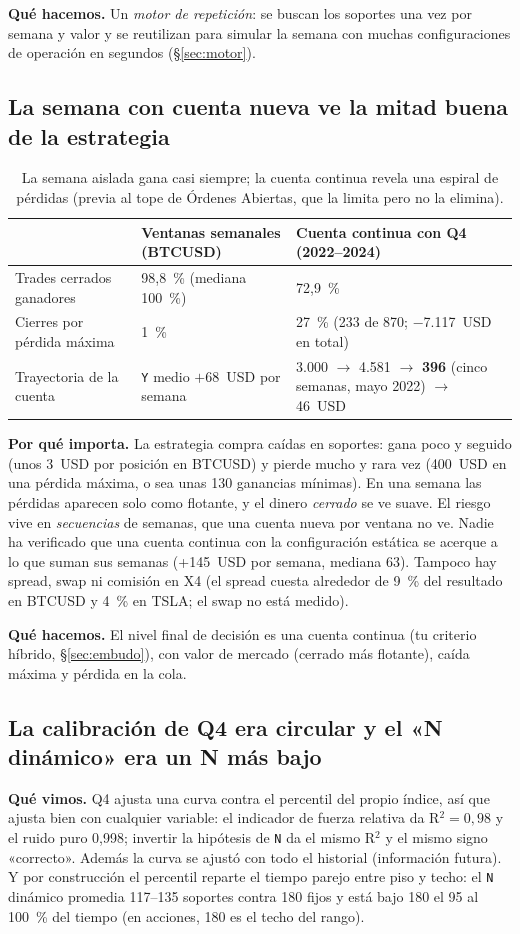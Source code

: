 \documentclass[11pt,a4paper]{article}
\newcommand{\code}[1]{\texttt{\small #1}}
\newcommand{\mn}[1]{$-$#1}
\begin{document}
\textbf{Qué hacemos.} Un \emph{motor de repetición}: se buscan los soportes una vez por semana y valor y se
reutilizan para simular la semana con muchas configuraciones de operación en segundos (§\ref{sec:motor}).

\subsection{La semana con cuenta nueva ve la mitad buena de la estrategia}
\begin{table}[H]
\centering\small
\begin{tabularx}{\linewidth}{lXX}
\toprule
 & Ventanas semanales (BTCUSD) & Cuenta continua con Q4 (2022--2024) \\
\midrule
Trades cerrados ganadores & 98,8~\% (mediana 100~\%) & 72,9~\% \\
Cierres por pérdida máxima & 1~\% & 27~\% (233 de 870; \mn{}7.117~USD en total) \\
Trayectoria de la cuenta & \code{Y} medio $+$68~USD por semana & 3.000 $\rightarrow$ 4.581 $\rightarrow$ \textbf{396} (cinco semanas, mayo 2022) $\rightarrow$ 46~USD \\
\bottomrule
\end{tabularx}
\caption{La semana aislada gana casi siempre; la cuenta continua revela una espiral de pérdidas (previa al tope
de Órdenes Abiertas, que la limita pero no la elimina).}
\end{table}

\textbf{Por qué importa.} La estrategia compra caídas en soportes: gana poco y seguido (unos 3~USD por posición
en BTCUSD) y pierde mucho y rara vez (400~USD en una pérdida máxima, o sea unas 130 ganancias mínimas). En una
semana las pérdidas aparecen solo como flotante, y el dinero \emph{cerrado} se ve suave. El riesgo vive en
\emph{secuencias} de semanas, que una cuenta nueva por ventana no ve. Nadie ha verificado que una cuenta continua
con la configuración estática se acerque a lo que suman sus semanas (+145~USD por semana, mediana 63).
Tampoco hay spread, swap ni comisión en X4 (el spread cuesta alrededor de 9~\% del resultado en BTCUSD y 4~\%
en TSLA; el swap no está medido).

\textbf{Qué hacemos.} El nivel final de decisión es una cuenta continua (tu criterio híbrido, §\ref{sec:embudo}),
con valor de mercado (cerrado más flotante), caída máxima y pérdida en la cola.

\subsection{La calibración de Q4 era circular y el «N dinámico» era un N más bajo}
\textbf{Qué vimos.} Q4 ajusta una curva contra el percentil del propio índice, así que ajusta bien con
cualquier variable: el indicador de fuerza relativa da R$^2=0{,}98$ y el ruido puro 0,998; invertir la hipótesis
de \code{N} da el mismo R$^2$ y el mismo signo «correcto». Además la curva se ajustó con todo el historial
(información futura). Y por construcción el percentil reparte el tiempo parejo entre piso y techo: el \code{N}
dinámico promedia 117--135 soportes contra 180 fijos y está bajo 180 el 95 al 100~\% del tiempo (en acciones, 180 es
el techo del rango).
\end{document}
